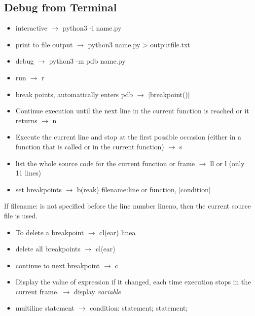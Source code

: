 \documentclass{article}
\begin{document}
\begin{multicols}{2}
\section{Debug from Terminal}

\begin{itemize}
\item interactive $\rightarrow$ python3 -i name.py
\item print to file output $\rightarrow$ python3 name.py > outputfile.txt
\item debug $\rightarrow$ python3 -m pdb name.py \cite{pdb}
\item run $\rightarrow$ r
\item break points, automatically enters pdb $\rightarrow$  |breakpoint()|
\item Continue execution until the next line in the current function is reached or it returns $\rightarrow$ n
\item Execute the current line and stop at the first possible occasion (either in a function that is called or in the current function)  $\rightarrow$ s
\item list the whole source code for the current function or frame $\rightarrow$ ll  or l (only 11 lines)
\item set breakpoints $\rightarrow$ b(reak) filename:line or function, [condition]
\end{itemize}
If filename: is not specified before the line number lineno, then the current source file is used.
\begin{itemize}
\item To delete a breakpoint $\rightarrow$ cl(ear) linea
\item delete all breakpoints $\rightarrow$ cl(ear)
\item continue to next breakpoint $\rightarrow$ c
\item Display the value of expression if it changed, each time execution stops in the current frame. $\rightarrow$  display \textit{variable}
\item multiline statement $\rightarrow$ condition: statement; statement;
\end{itemize}

\end{multicols}
\end{document}
